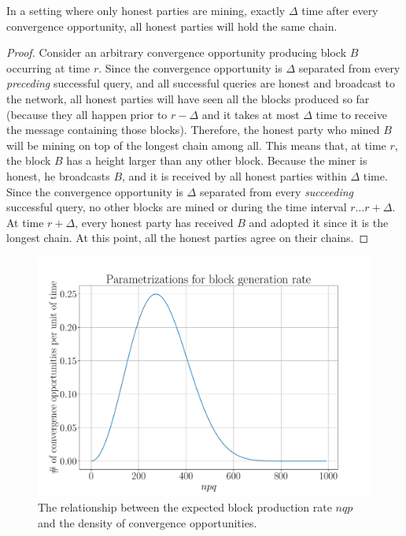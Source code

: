 \begin{lemma}\label{lem:honest-convergence}
    In a setting where only honest parties are mining, exactly $\Delta$ time after every convergence
    opportunity, all honest parties will hold the same chain.
\end{lemma}
\begin{proof}
    Consider an arbitrary convergence opportunity producing block $B$ occurring at time $r$.
    Since the convergence opportunity is $\Delta$ separated from every \emph{preceding} successful query,
    and all successful queries are honest and broadcast to the network, all honest parties will
    have seen all the blocks produced so far (because they all happen prior to $r - \Delta$ and it
    takes at most $\Delta$ time to receive the message containing those blocks).
    Therefore, the honest party who mined $B$
    will be mining on top of the longest chain among all. This means
    that, at time $r$, the block $B$ has a height larger than any other
    block. Because the miner is honest, he broadcasts $B$, and it is received by all honest parties within $\Delta$
    time. Since the convergence opportunity is $\Delta$ separated from every \emph{succeeding} successful
    query, no other blocks are mined or during the time interval $r \ldots r + \Delta$.
    At time $r + \Delta$, every honest party has received $B$ and adopted it since it is
    the longest chain. At this point, all the honest parties agree on their chains.
\end{proof}

\begin{figure}[h]
    \centering
    \includegraphics[width=0.8 \columnwidth,keepaspectratio]{figures/p-vs-convergence-opportunities.pdf}
    \caption{The relationship between the expected block production rate $nqp$
             and the density of convergence opportunities.}
    \label{fig.p-vs-convergence-opportunities}
\end{figure}

